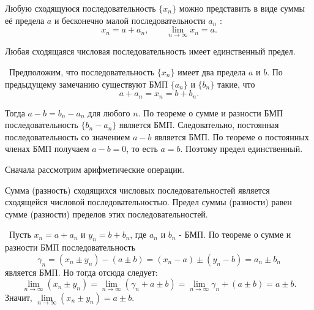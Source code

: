 \begin{note}
Любую сходящуюся последовательность \(\{x_{n}\}\) можно представить в виде суммы
её предела \(a\) и бесконечно малой последовательности \(a_{n}\) :
\[
x_{n} = a + a_{n}, \qquad \lim\limits_{n\to\infty}x_{n} = a.
\]
\end{note}

\begin{theorem}
Любая сходящаяся числовая последовательность имеет единственный предел.

\vspace{2mm}

\proofname~Предположим, что последовательность \(\{x_{n}\}\) имеет
два предела \(a\) и \(b\). По предыдущему замечанию существуют БМП
\(\{a_{n}\}\) и \(\{b_{n}\}\) такие, что
\[
a + a_{n} = x_{n} = b+ b_{n}.
\]

Тогда \(a - b = b_{n} - a_{n}\) для любого \(n\). По теореме о сумме и
разности БМП последовательность \(\{b_{n} - a_{n}\}\) является БМП.
Следовательно, постоянная последовательность со значением \(a - b\)
является БМП. По теореме о постоянных членах БМП получаем \(a - b = 0\),
то есть \(a = b\). Поэтому предел единственный.~\qedsymbol
\end{theorem}


Сначала рассмотрим арифметические операции.

\begin{theorem}
Сумма (разность) сходящихся числовых последовательностей является
сходящейся числовой последовательностью. Предел суммы (разности)
равен сумме (разности) пределов этих последовательностей.

\vspace{2mm}

\proofname~Пусть \(x_{n} = a + a_{n}\) и \(y_{n} = b + b_{n}\), где \(a_{n}\) и \(b_{n}\) - БМП.
По теореме о сумме и разности БМП последовательность
\[
\gamma_{n} = (x_{n} \pm y_{n}) - (a \pm b) = (x_{n} - a) \pm (y_{n} - b) = a_{n} \pm b_{n}
\]
является БМП. Но тогда отсюда следует:
\[
\lim_{ n \to \infty } (x_{n} \pm y_{n}) =
\lim_{ n \to \infty } (\gamma_{n} + a \pm b) =
\lim_{ n \to \infty } \gamma_{n} + (a \pm b) = a \pm b.
\]
Значит, \(\lim\limits_{n\to\infty}(x_{n}\pm y_{n})=a\pm b\).~\qedsymbol
\end{theorem}

